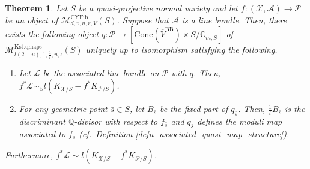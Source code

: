 \documentclass[12pt,twoside]{amsart}
\newtheorem{thm}{Theorem}[section]
\theoremstyle{definition}
\begin{document}
\begin{thm}\label{thm--quasi--map--const}
        Let $S$ be a quasi-projective normal variety and let $f\colon(\mathcal{X},\mathcal{A})\to\mathcal{P}$ be an object of $\mathcal{M}_{d,v,u,r,V}^{\mathrm{CYFib}}(S)$.
        Suppose that $\mathcal{A}$ is a line bundle.
Then, there exists the following object $q\colon \mathcal{P}\to [\mathrm{Cone}(\overline{V}^{\mathrm{BB}})\times S/\mathbb{G}_{m,S}]$ of $\mathcal{M}_{l(2-u),1,\frac{1}{l},u,\iota}^{\mathrm{Kst.qmaps}}(S)$ uniquely up to isomorphism satisfying the following. 
\begin{enumerate}
\item Let $\mathscr{L}$ be the associated line bundle on $\mathcal{P}$ with $q$. Then, $f^*\mathscr{L}\sim_S l(K_{\mathcal{X}/S}-f^*K_{\mathcal{P}/S})$.
\item For any geometric point $\bar{s}\in S$, let $B_{\bar{s}}$ be the fixed part of $q_{\bar{s}}$.
Then, $\frac{1}{l}B_{\bar{s}}$ is the discriminant $\mathbb{Q}$-divisor with respect to $f_{\bar{s}}$ and $q_{\bar{s}}$ defines the moduli map associated to $f_{\bar{s}}$ (cf.~Definition \ref{defn--associated--quasi--map--structure}).
\end{enumerate}
Furthermore, $f^*\mathscr{L}\sim l(K_{\mathcal{X}/S}-f^*K_{\mathcal{P}/S})$.
    \end{thm}
\end{document}
